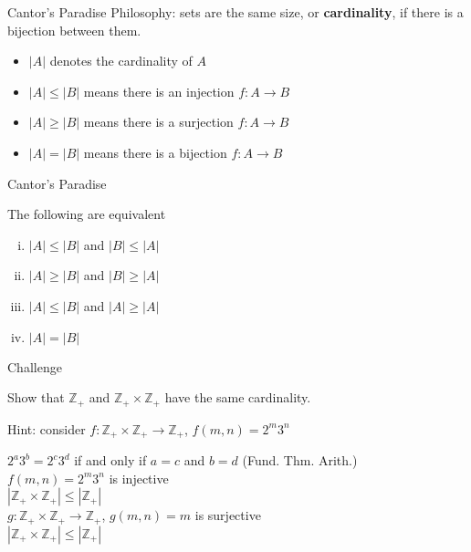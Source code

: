 \documentclass{beamer}
\begin{document}
\begin{frame}{Cantor's Paradise}
Philosophy: sets are the same size, or \textbf{cardinality}, if there is a bijection between them.
\begin{itemize}
\pause 
\item $|A|$ denotes the cardinality of $A$
\pause 
\item $|A| \leq |B|$ means there is an injection $f: A\rightarrow B$
\pause 
\item $|A| \geq |B|$ means there is a surjection $f: A\rightarrow B$
\pause 
\item $|A| = |B|$ means there is a bijection $f: A\rightarrow B$
\end{itemize}
\pause
\end{frame}

\begin{frame}{Cantor's Paradise}
\begin{thm}
The following are equivalent
\begin{enumerate}[(i)]
\item $|A|\leq |B|$  and $|B|\leq |A|$
\item $|A|\geq |B|$  and $|B|\geq |A|$
\item $|A|\leq |B|$  and $|A|\geq |A|$
\item $|A|= |B|$
\end{enumerate}
\end{thm}
\end{frame}

\begin{frame}{Challenge}
\begin{prob}
Show that $\mathbb{Z}_+$ and $\mathbb{Z}_+\times\mathbb{Z}_+$ have the same cardinality.
\end{prob}
\pause
Hint: consider $f: \mathbb{Z}_+\times\mathbb{Z}_+\rightarrow\mathbb{Z}_+$, $f(m,n) = 2^m3^n$
\begin{soln}
\pause
$2^a3^b = 2^c3^d$ if and only if $a=c$ and $b=d$ (Fund. Thm. Arith.)\\
\pause
$f(m,n) = 2^m3^n$ is injective\\
\pause
$|\mathbb{Z}_+\times\mathbb{Z}_+|\leq |\mathbb{Z}_+|$\\
\pause
$g: \mathbb{Z}_+\times\mathbb{Z}_+\rightarrow\mathbb{Z}_+$, $g(m,n) = m$ is surjective\\
\pause
$|\mathbb{Z}_+\times\mathbb{Z}_+|\leq |\mathbb{Z}_+|$
\end{soln}
\end{frame}
\end{document}
